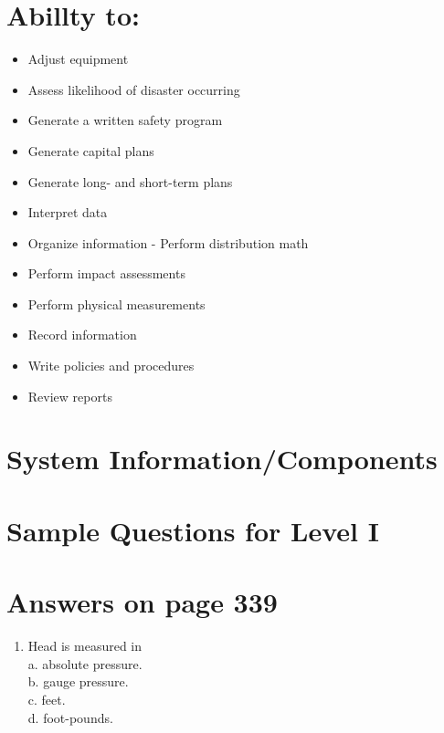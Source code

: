 \documentclass[10pt]{article}
\begin{document}
\section{Abillty to:}
\begin{itemize}
  \item Adjust equipment

  \item Assess likelihood of disaster occurring

  \item Generate a written safety program

  \item Generate capital plans

  \item Generate long- and short-term plans

  \item Interpret data

  \item Organize information - Perform distribution math

  \item Perform impact assessments

  \item Perform physical measurements

  \item Record information

  \item Write policies and procedures

  \item Review reports

\end{itemize}

\section{System Information/Components}
\section{Sample Questions for Level I}
\section{Answers on page 339}
\begin{enumerate}
  \item Head is measured in\\
a. absolute pressure.\\
b. gauge pressure.\\
c. feet.\\
d. foot-pounds.
\end{enumerate}
\end{document}
